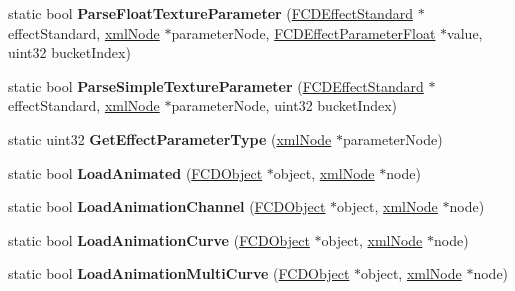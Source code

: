 \begin{DoxyCompactItemize}
\item 
\hypertarget{classFArchiveXML_a3564c020122c1c0dc5b42cb0d29bac74}{
static bool {\bfseries ParseFloatTextureParameter} (\hyperlink{classFCDEffectStandard}{FCDEffectStandard} $\ast$effectStandard, \hyperlink{struct__xmlNode}{xmlNode} $\ast$parameterNode, \hyperlink{classFCDEffectParameterAnimatableT}{FCDEffectParameterFloat} $\ast$value, uint32 bucketIndex)}
\label{classFArchiveXML_a3564c020122c1c0dc5b42cb0d29bac74}

\item 
\hypertarget{classFArchiveXML_a8bb8080121201b7b720577379407ee7b}{
static bool {\bfseries ParseSimpleTextureParameter} (\hyperlink{classFCDEffectStandard}{FCDEffectStandard} $\ast$effectStandard, \hyperlink{struct__xmlNode}{xmlNode} $\ast$parameterNode, uint32 bucketIndex)}
\label{classFArchiveXML_a8bb8080121201b7b720577379407ee7b}

\item 
\hypertarget{classFArchiveXML_aef32fcbf50e0217463fdb5aa244b0c0b}{
static uint32 {\bfseries GetEffectParameterType} (\hyperlink{struct__xmlNode}{xmlNode} $\ast$parameterNode)}
\label{classFArchiveXML_aef32fcbf50e0217463fdb5aa244b0c0b}

\item 
\hypertarget{classFArchiveXML_ab90611d72d439141c2afa67bdb608775}{
static bool {\bfseries LoadAnimated} (\hyperlink{classFCDObject}{FCDObject} $\ast$object, \hyperlink{struct__xmlNode}{xmlNode} $\ast$node)}
\label{classFArchiveXML_ab90611d72d439141c2afa67bdb608775}

\item 
\hypertarget{classFArchiveXML_a11076b3abe8bab3edeb99630d6db1238}{
static bool {\bfseries LoadAnimationChannel} (\hyperlink{classFCDObject}{FCDObject} $\ast$object, \hyperlink{struct__xmlNode}{xmlNode} $\ast$node)}
\label{classFArchiveXML_a11076b3abe8bab3edeb99630d6db1238}

\item 
\hypertarget{classFArchiveXML_a9314af33577fe249ec39ccb42d5c059d}{
static bool {\bfseries LoadAnimationCurve} (\hyperlink{classFCDObject}{FCDObject} $\ast$object, \hyperlink{struct__xmlNode}{xmlNode} $\ast$node)}
\label{classFArchiveXML_a9314af33577fe249ec39ccb42d5c059d}

\item 
\hypertarget{classFArchiveXML_a80ab0a3010b7723624892e7006201951}{
static bool {\bfseries LoadAnimationMultiCurve} (\hyperlink{classFCDObject}{FCDObject} $\ast$object, \hyperlink{struct__xmlNode}{xmlNode} $\ast$node)}
\label{classFArchiveXML_a80ab0a3010b7723624892e7006201951}


\end{DoxyCompactItemize}
